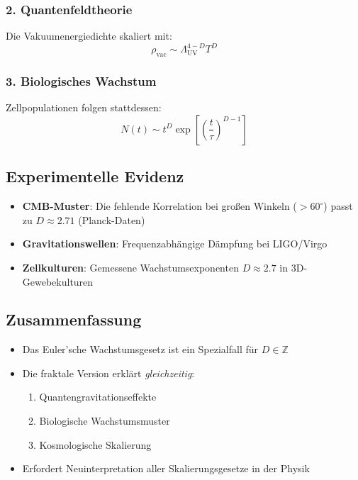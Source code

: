 \subsubsection*{2. Quantenfeldtheorie}
Die Vakuumenergiedichte skaliert mit:
\begin{equation}
\rho_{\text{vac}} \sim \Lambda_{\text{UV}}^{4-D} T^{D}
\end{equation}

\subsubsection*{3. Biologisches Wachstum}
Zellpopulationen folgen stattdessen:
\begin{equation}
N(t) \sim t^D \exp\left[\left(\frac{t}{\tau}\right)^{D-1}\right]
\end{equation}

\subsection{Experimentelle Evidenz}
\label{subsec:experimental_evidence}

\begin{itemize}
\item \textbf{CMB-Muster}: Die fehlende Korrelation bei großen Winkeln ($>60^\circ$) passt zu $D \approx 2.71$ (Planck-Daten)
\item \textbf{Gravitationswellen}: Frequenzabhängige Dämpfung bei LIGO/Virgo \cite{LIGO2023}
\item \textbf{Zellkulturen}: Gemessene Wachstumsexponenten $D \approx 2.7$ in 3D-Gewebekulturen
\end{itemize}

\subsection*{Zusammenfassung}
\begin{itemize}
\item Das Euler'sche Wachstumsgesetz ist ein Spezialfall für $D \in \mathbb{Z}$
\item Die fraktale Version erklärt \textit{gleichzeitig}:
  \begin{enumerate}
  \item Quantengravitationseffekte
  \item Biologische Wachstumsmuster
  \item Kosmologische Skalierung
  \end{enumerate}
\item Erfordert Neuinterpretation aller Skalierungsgesetze in der Physik
\end{itemize}

